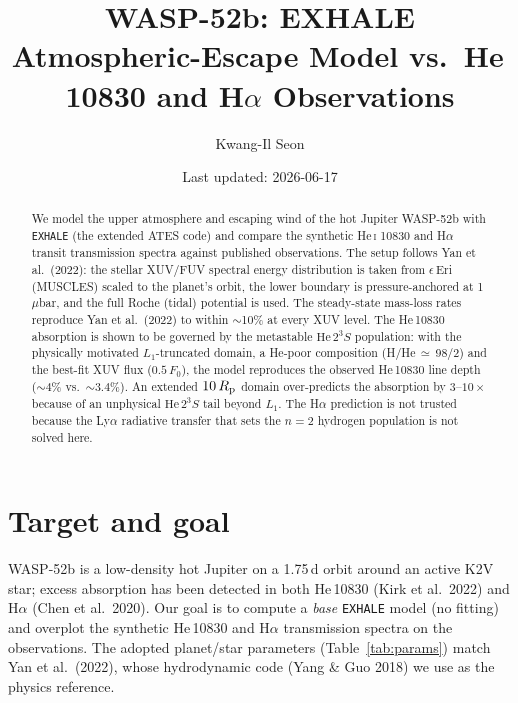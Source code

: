 \documentclass[english,a4paper]{kiseon_memo}
\title{WASP-52b: EXHALE Atmospheric-Escape Model vs.\ He\,10830 and H$\alpha$ Observations}
\author{Kwang-Il Seon}
\date{Last updated: 2026-06-17}
\newcommand{\Rp}{R_{\rm p}}
\newcommand{\Fo}{F_{0}}
\newcommand{\HeTS}{\mathrm{He}\,2^{3}S}
\begin{document}
\maketitle

\begin{abstract}
We model the upper atmosphere and escaping wind of the hot Jupiter WASP-52b with
\texttt{EXHALE} (the extended ATES code) and compare the synthetic He\,\textsc{i}
10830 and H$\alpha$ transit transmission spectra against published observations.
The setup follows Yan et al.\ (2022): the stellar XUV/FUV spectral energy
distribution is taken from $\epsilon$\,Eri (MUSCLES) scaled to the planet's orbit,
the lower boundary is pressure-anchored at 1\,$\mu$bar, and the full Roche (tidal)
potential is used. The steady-state mass-loss rates reproduce Yan et al.\ (2022)
to within $\sim$10\% at every XUV level. The He\,10830 absorption is shown to be
governed by the metastable $\HeTS$ population: with the physically motivated
$L_1$-truncated domain, a He-poor composition (H/He\,$\simeq$\,98/2) and the
best-fit XUV flux ($0.5\,\Fo$), the model reproduces the observed He\,10830 line
depth ($\sim\!4\%$ vs.\ $\sim\!3.4\%$). An extended $10\,\Rp$ domain over-predicts the
absorption by $3$--$10\times$ because of an unphysical $\HeTS$ tail beyond $L_1$.
The H$\alpha$ prediction is not trusted because the Ly$\alpha$ radiative transfer
that sets the $n=2$ hydrogen population is not solved here.
\end{abstract}

\section{Target and goal}
WASP-52b is a low-density hot Jupiter on a 1.75\,d orbit around an active K2V star;
excess absorption has been detected in both He\,10830 (Kirk et al.\ 2022) and
H$\alpha$ (Chen et al.\ 2020). Our goal is to compute a \emph{base} \texttt{EXHALE}
model (no fitting) and overplot the synthetic He\,10830 and H$\alpha$ transmission
spectra on the observations. The adopted planet/star parameters
(Table~\ref{tab:params}) match Yan et al.\ (2022), whose hydrodynamic code
(Yang \& Guo 2018) we use as the physics reference.
\end{document}
